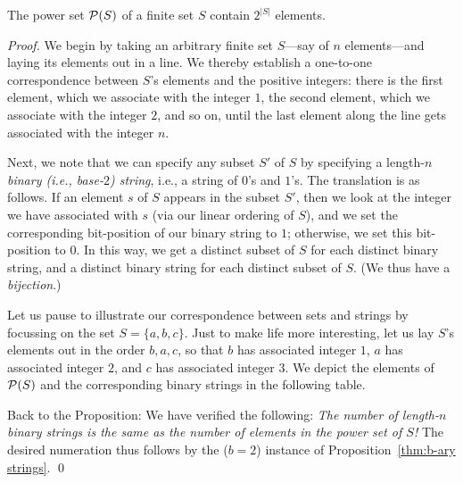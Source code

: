 \begin{prop}
\label{thm:power-sets}
The power set $\mbox{$\cal P$}(S)$ of a finite set $S$ contain $2^{|S|}$ elements.
\end{prop}

\begin{proof}
We begin by taking an arbitrary finite set $S$---say of $n$
elements---and laying its elements out in a line.  We thereby
establish a one-to-one correspondence between $S$'s elements and the positive
integers: there is the first element, which we associate with the
integer $1$, the second element, which we associate with the integer
$2$, and so on, until the last element along the line gets associated
with the integer $n$.

Next, we note that we can specify any subset $S'$ of $S$ by
specifying a length-$n$ {\em binary (i.e., base-$2$) string}, i.e., a
string of $0$'s and $1$'s.  The translation is as follows.  If an
element $s$ of $S$ appears in the subset $S'$, then we look at the
integer we have associated with $s$ (via our linear ordering of $S$),
and we set the corresponding bit-position of our binary string to $1$;
otherwise, we set this bit-position to $0$.  In this way, we get a
distinct subset of $S$ for each distinct binary string, and a distinct
binary string for each distinct subset of $S$.  (We thus have a {\em bijection}.)

Let us pause to illustrate our correspondence between sets and strings
by focussing on the set $S = \{a,b,c\}$.  Just to make life more
interesting, let us lay $S$'s elements out in the order $b,a,c$, so
that $b$ has associated integer $1$, $a$ has associated integer $2$,
and $c$ has associated integer $3$.  We depict the elements of $\mbox{$\cal P$}(S)$
and the corresponding binary strings in the following table.
\begin{center}
\end{center}

Back to the Proposition: We have verified the following: {\em The
  number of length-$n$ binary strings is the same as the number of
  elements in the power set of $S$!}  The desired numeration thus
follows by the ($b=2$) instance of Proposition~\ref{thm:b-ary
  strings}.  \qed
\end{proof}

